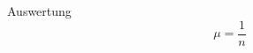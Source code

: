 \documentclass[twoside]{protokoll}
\begin{document}
\begin{aufgabe}{Auswertung}
\begin{equation}
	\mu = \frac{1}{n}
\end{equation}



\end{aufgabe}
 
\end{document}
